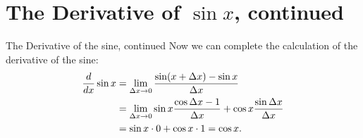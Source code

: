 \section{The Derivative of $\sin x$, continued}{}
{The Derivative of the sine, continued}
\nobreak
Now we can complete the calculation of the derivative of the sine:
\begin{align*}
{d\over dx}\sin x &= \lim_{\Delta x\to0} {\sin(x+\Delta x)-\sin x
  \over \Delta x} \\
&=\lim_{\Delta x\to0} 
\sin x{\cos \Delta x - 1\over \Delta x}+\cos x{\sin\Delta x\over
  \Delta x} \\
&=\sin x \cdot 0 + \cos x \cdot 1 = \cos x. \\
\end{align*}

